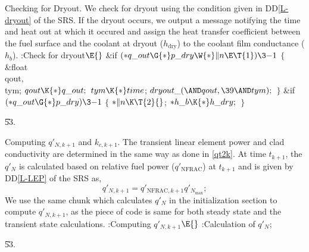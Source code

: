 \documentclass[letterpaper,12pt,baseclass=report]{cweb-hy}
\begin{document}
{Checking for Dryout.
We check for dryout using the condition given in DD\ref{L-dryout} of the SRS.
If the dryout occurs, we output a message notifying the time and heat out
at which it occured and assign the heat transfer coefficient between the fuel
surface and the coolant at dryout ($h_{\text{dry}}$) to the coolant film
conductance
($h_b$).
\Y\B\4:Check for dryout\X${}\E{}$\6
\&{if} ${}({*}\\{q\_out}\G{*}\\{p\_dry}\W{*}\|n\E\T{1})\3{-1}{}$\5
${}\{{}$\1\6
\&{float} \\{qout}${},{}$ \\{tym};\7
${}\\{qout}\K{*}\\{q\_out};{}$\6
${}\\{tym}\K{*}\\{time}{}$;\6
${}\\{dryout\_}({\AND}\\{qout},\39{\AND}\\{tym});{}$\6
\4${}\}{}$\2\6
\&{if} ${}({*}\\{q\_out}\G{*}\\{p\_dry})\3{-1}{}$\5
${}\{{}$\1\6
${}{*}\|n\K\T{2}{}$;\6
${}{*}\\{h\_b}\K{*}\\{h\_dry};{}$\6
\4${}\}{}$\2\par
\U53.\fi

\fi

Computing ${q'_{N,k+1}}$ and ${k_{c,k+1}}$.
The transient linear element power and clad conductivity are determined
in the same way as done in \ref{qt2k}. At time $t_{k+1}$, the $q'_N$ is
calculated
based on relative fuel power ($q'_{\mathrm{NFRAC}}$) at $t_{k+1}$ and is given
by
DD\ref{L-LEP} of the SRS as,
\begin{equation}
q'_{N,k+1} = q'_{\text{NFRAC},k+1}q'_{N_{\text{max}}};
\end{equation}
We use the same chunk which calculates $q'_N$ in the initialization section to
compute
${q'_{N,k+1}}$, as the piece of code is same for both steady state and the
transient
state calculations.
\Y\B\4:Computing $q'_{N,k+1}$\X${}\E{}$\6
:Calculation of $q'_{N}$\X;\par
\U53.\fi

}
\end{document}
